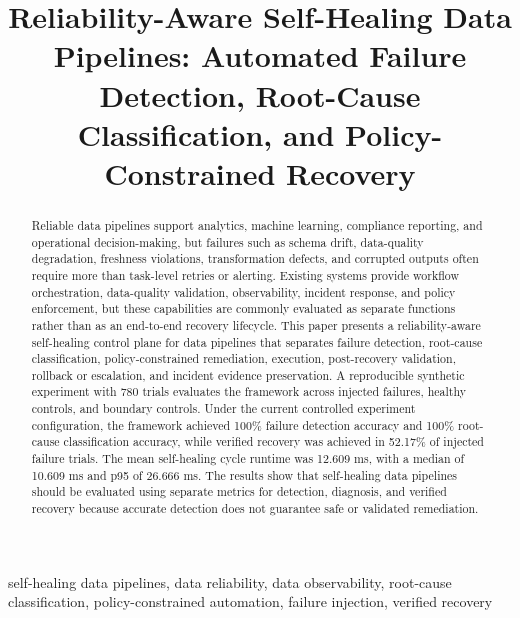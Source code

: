 \documentclass[conference]{IEEEtran}
\begin{document}
\title{Reliability-Aware Self-Healing Data Pipelines: Automated Failure Detection, Root-Cause Classification, and Policy-Constrained Recovery}

\author{
}

\maketitle

\begin{abstract}
Reliable data pipelines support analytics, machine learning, compliance reporting, and operational decision-making, but failures such as schema drift, data-quality degradation, freshness violations, transformation defects, and corrupted outputs often require more than task-level retries or alerting. Existing systems provide workflow orchestration, data-quality validation, observability, incident response, and policy enforcement, but these capabilities are commonly evaluated as separate functions rather than as an end-to-end recovery lifecycle. This paper presents a reliability-aware self-healing control plane for data pipelines that separates failure detection, root-cause classification, policy-constrained remediation, execution, post-recovery validation, rollback or escalation, and incident evidence preservation. A reproducible synthetic experiment with 780 trials evaluates the framework across injected failures, healthy controls, and boundary controls. Under the current controlled experiment configuration, the framework achieved 100\% failure detection accuracy and 100\% root-cause classification accuracy, while verified recovery was achieved in 52.17\% of injected failure trials. The mean self-healing cycle runtime was 12.609 ms, with a median of 10.609 ms and p95 of 26.666 ms. The results show that self-healing data pipelines should be evaluated using separate metrics for detection, diagnosis, and verified recovery because accurate detection does not guarantee safe or validated remediation.
\end{abstract}

\begin{IEEEkeywords}
self-healing data pipelines, data reliability, data observability, root-cause classification, policy-constrained automation, failure injection, verified recovery
\end{IEEEkeywords}
\end{document}
